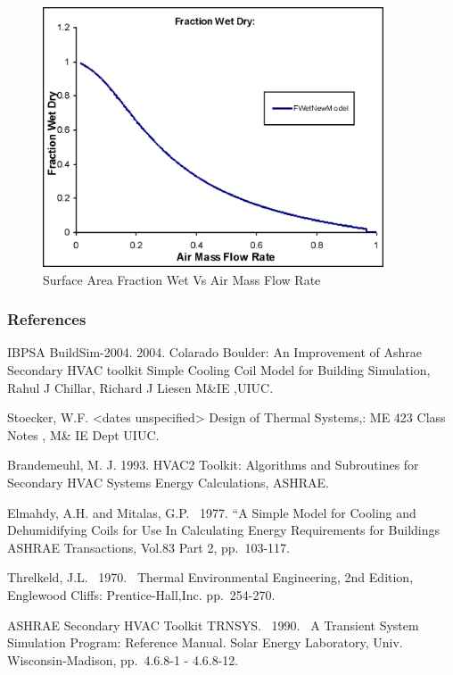 \begin{figure}[hbtp] %
\centering
\includegraphics[width=0.9\textwidth, height=0.9\textheight, keepaspectratio=true]{media/image3351.png}
\caption{Surface Area Fraction Wet Vs Air Mass Flow Rate \protect \label{fig:surface-area-fraction-wet-vs-air-mass-flow}}
\end{figure}

\subsubsection{References}\label{references-011}

IBPSA BuildSim-2004. 2004. Colarado Boulder: An Improvement of Ashrae Secondary HVAC toolkit Simple Cooling Coil Model for Building Simulation, Rahul J Chillar, Richard J Liesen M\&IE ,UIUC.

Stoecker, W.F. \textless{}dates unspecified\textgreater{} Design of Thermal Systems,: ME 423 Class Notes , M\& IE Dept UIUC.

Brandemeuhl, M. J. 1993. HVAC2 Toolkit: Algorithms and Subroutines for Secondary HVAC Systems Energy Calculations, ASHRAE.

Elmahdy, A.H. and Mitalas, G.P.~ 1977. ``A Simple Model for Cooling and Dehumidifying Coils for Use In Calculating Energy Requirements for Buildings ASHRAE Transactions, Vol.83 Part 2, pp.~103-117.

Threlkeld, J.L.~ 1970.~ Thermal Environmental Engineering, 2nd Edition, Englewood Cliffs: Prentice-Hall,Inc. pp.~254-270.

ASHRAE Secondary HVAC Toolkit TRNSYS.~ 1990.~ A Transient System Simulation Program: Reference Manual. Solar Energy Laboratory, Univ. Wisconsin-Madison, pp.~4.6.8-1 - 4.6.8-12.

